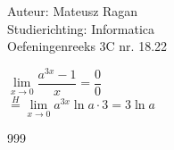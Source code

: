 \documentclass[a4paper]{article}
\begin{document}
\noindent \large Auteur: Mateusz Ragan \\
\noindent \large Studierichting: Informatica\\
\noindent \large Oefeningenreeks 3C nr. 18.22\\

\medskip

\normalsize

$\lim\limits_{x \rightarrow 0} \dfrac{a^{3x}-1}{x} = \dfrac{0}{0}$\\

$\overset{H}{=} \lim\limits_{x \rightarrow 0} a^{3x}\ln a \cdot 3 = 3\ln a$

\begin{thebibliography}{999}
\end{thebibliography}
\end{document}
